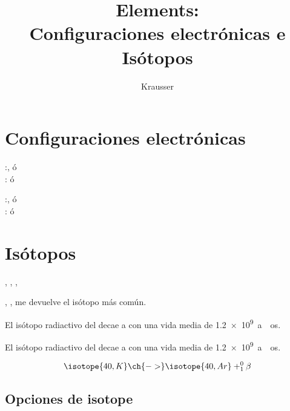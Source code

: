 \documentclass[11pt,a4paper]{article}
\title{Elements:\\ Configuraciones electr\'onicas e Is\'otopos}
\author{Krausser}
\date{}
\begin{document}
\maketitle

\section*{Configuraciones electr\'onicas}
:, \'o \\
:  \'o  

:, \'o \\
:  \'o  


\vspace{1cm}

\section*{Is\'otopos}
, , , 


, , me devuelve el is\'otopo m\'as com\'un.

El isótopo radiactivo del  decae a  con una vida media de \SI{1.2e9}{aos}.

El isótopo radiactivo del  decae a  con una vida media de \SI{1.2e9}{aos}.

\begin{equation*}
\isotope{40,K} \ch{->} \isotope{40,Ar} + ^{0}_{1}\beta
\end{equation*}

\subsection*{Opciones de isotope}

 
\end{document}
